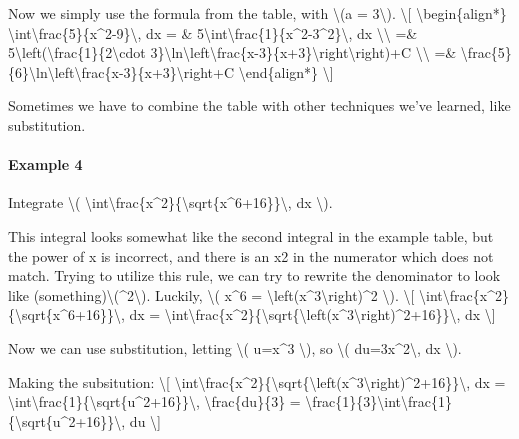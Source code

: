 Now we simply use the formula from the table, with \textbackslash{}(a =
3\textbackslash{}). \textbackslash{}{[} \textbackslash{}begin\{align*\}
\textbackslash{}int\textbackslash{}frac\{5\}\{x\^{}2-9\}\textbackslash{},
dx = \&
5\textbackslash{}int\textbackslash{}frac\{1\}\{x\^{}2-3\^{}2\}\textbackslash{},
dx \textbackslash{}\textbackslash{} =\&
5\textbackslash{}left(\textbackslash{}frac\{1\}\{2\textbackslash{}cdot
3\}\textbackslash{}ln\textbackslash{}left\textbar{}\textbackslash{}frac\{x-3\}\{x+3\}\textbackslash{}right\textbar{}\textbackslash{}right)+C
\textbackslash{}\textbackslash{} =\&
\textbackslash{}frac\{5\}\{6\}\textbackslash{}ln\textbackslash{}left\textbar{}\textbackslash{}frac\{x-3\}\{x+3\}\textbackslash{}right\textbar{}+C
\textbackslash{}end\{align*\} \textbackslash{}{]}

Sometimes we have to combine the table with other techniques we've
learned, like substitution.

\hypertarget{example-4}{%
\paragraph{Example 4}\label{example-4}}

Integrate \textbackslash{}(
\textbackslash{}int\textbackslash{}frac\{x\^{}2\}\{\textbackslash{}sqrt\{x\^{}6+16\}\}\textbackslash{},
dx \textbackslash{}).

This integral looks somewhat like the second integral in the example
table, but the power of x is incorrect, and there is an x2 in the
numerator which does not match. Trying to utilize this rule, we can try
to rewrite the denominator to look like
(something)\textbackslash{}(\^{}2\textbackslash{}). Luckily,
\textbackslash{}( x\^{}6 =
\textbackslash{}left(x\^{}3\textbackslash{}right)\^{}2
\textbackslash{}). \textbackslash{}{[}
\textbackslash{}int\textbackslash{}frac\{x\^{}2\}\{\textbackslash{}sqrt\{x\^{}6+16\}\}\textbackslash{},
dx =
\textbackslash{}int\textbackslash{}frac\{x\^{}2\}\{\textbackslash{}sqrt\{\textbackslash{}left(x\^{}3\textbackslash{}right)\^{}2+16\}\}\textbackslash{},
dx \textbackslash{}{]}

Now we can use substitution, letting \textbackslash{}( u=x\^{}3
\textbackslash{}), so \textbackslash{}( du=3x\^{}2\textbackslash{}, dx
\textbackslash{}).

Making the subsitution: \textbackslash{}{[}
\textbackslash{}int\textbackslash{}frac\{x\^{}2\}\{\textbackslash{}sqrt\{\textbackslash{}left(x\^{}3\textbackslash{}right)\^{}2+16\}\}\textbackslash{},
dx =
\textbackslash{}int\textbackslash{}frac\{1\}\{\textbackslash{}sqrt\{u\^{}2+16\}\}\textbackslash{},
\textbackslash{}frac\{du\}\{3\} =
\textbackslash{}frac\{1\}\{3\}\textbackslash{}int\textbackslash{}frac\{1\}\{\textbackslash{}sqrt\{u\^{}2+16\}\}\textbackslash{},
du \textbackslash{}{]}

